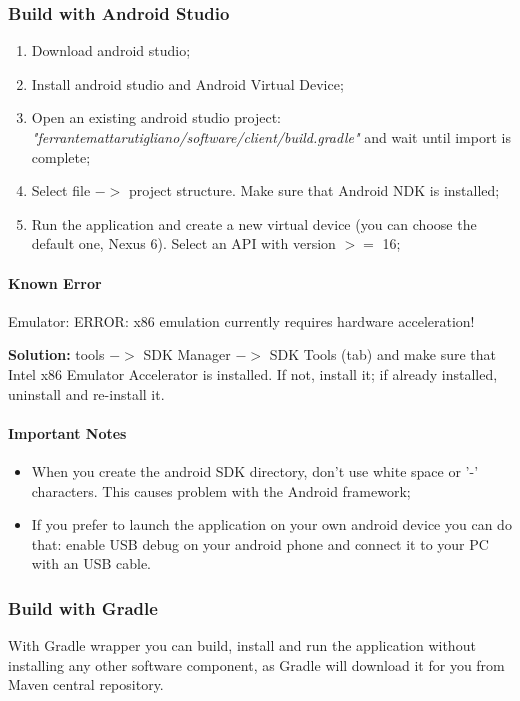 \documentclass[a4paper]{article}
\begin{document}
\subsubsection{Build with Android Studio}
\begin{enumerate}
    \item Download android studio;
    \item Install android studio and Android Virtual Device;
    \item Open an existing android studio project:
    \newline\textit{"ferrantemattarutigliano/software/client/build.gradle"} and wait until import is complete;
    \item Select file ${->}$ project structure. Make sure that Android NDK is installed;
    \item Run the application and create a new virtual device (you can choose the default one, Nexus 6). Select an API with version ${>=}$ 16;
\end{enumerate}

\paragraph{Known Error}
Emulator: ERROR: x86 emulation currently requires hardware acceleration!

\textbf{Solution:} tools ${->}$ SDK Manager ${->}$ SDK Tools (tab) and make sure that Intel x86 Emulator Accelerator is installed. If not, install it; if already installed, uninstall and re-install it.

\paragraph{Important Notes}
\begin{itemize}
    \item When you create the android SDK directory, don't use white space or '-' characters. This causes problem with the Android framework;
    \item If you prefer to launch the application on your own android device you can do that: enable USB debug on your android phone and connect it to your PC with an USB cable.
\end{itemize}

\subsubsection{Build with Gradle}
With Gradle wrapper you can build, install and run the application without installing any other software component, as Gradle will download it for you from Maven central repository.
\end{document}
